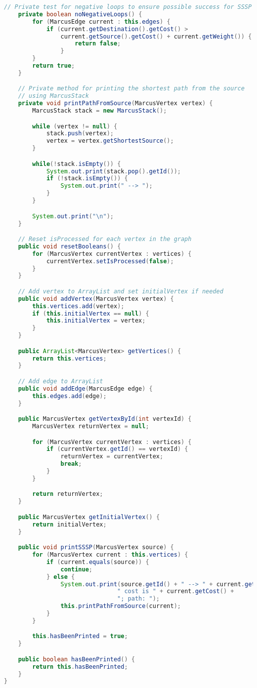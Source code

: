 \documentclass[letterpaper, 10pt]{article}
\begin{document}
\begin{lstlisting}[language=Java, firstnumber=1]
    // Private test for negative loops to ensure possible success for SSSP
    private boolean noNegativeLoops() {
        for (MarcusEdge current : this.edges) {
            if (current.getDestination().getCost() >
                current.getSource().getCost() + current.getWeight()) {
                    return false;
                }
        }
        return true;
    }

    // Private method for printing the shortest path from the source
    // using MarcusStack 
    private void printPathFromSource(MarcusVertex vertex) {
        MarcusStack stack = new MarcusStack();

        while (vertex != null) {
            stack.push(vertex);
            vertex = vertex.getShortestSource();
        }

        while(!stack.isEmpty()) {
            System.out.print(stack.pop().getId());
            if (!stack.isEmpty()) {
                System.out.print(" --> ");
            }
        }

        System.out.print("\n");
    }

    // Reset isProcessed for each vertex in the graph
    public void resetBooleans() {
        for (MarcusVertex currentVertex : vertices) {
            currentVertex.setIsProcessed(false);
        }
    }

    // Add vertex to ArrayList and set initialVertex if needed
    public void addVertex(MarcusVertex vertex) {
        this.vertices.add(vertex);
        if (this.initialVertex == null) {
            this.initialVertex = vertex;
        }
    }

    public ArrayList<MarcusVertex> getVertices() {
        return this.vertices;
    }

    // Add edge to ArrayList
    public void addEdge(MarcusEdge edge) {
        this.edges.add(edge);
    }

    public MarcusVertex getVertexById(int vertexId) {
        MarcusVertex returnVertex = null;

        for (MarcusVertex currentVertex : vertices) {
            if (currentVertex.getId() == vertexId) {
                returnVertex = currentVertex;
                break;
            }
        }

        return returnVertex;
    }

    public MarcusVertex getInitialVertex() {
        return initialVertex;
    }

    public void printSSSP(MarcusVertex source) {
        for (MarcusVertex current : this.vertices) {
            if (current.equals(source)) {
                continue;
            } else {
                System.out.print(source.getId() + " --> " + current.getId() +
                                " cost is " + current.getCost() +
                                "; path: ");
                this.printPathFromSource(current);
            }
        }

        this.hasBeenPrinted = true;
    }

    public boolean hasBeenPrinted() {
        return this.hasBeenPrinted;
    }
}

\end{lstlisting}
\end{document}

